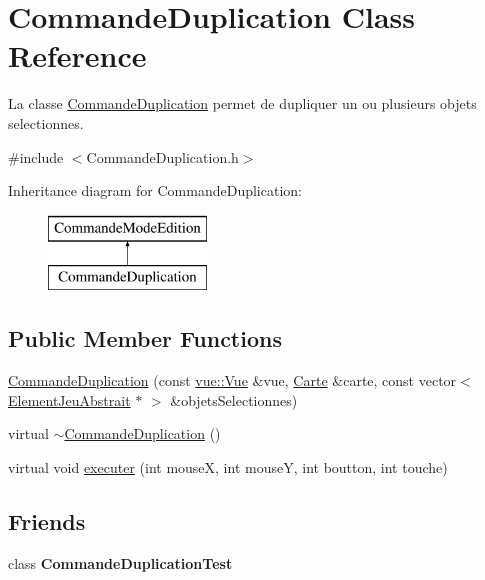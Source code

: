 \hypertarget{class_commande_duplication}{\section{Commande\-Duplication Class Reference}
\label{class_commande_duplication}
}


La classe \hyperlink{class_commande_duplication}{Commande\-Duplication} permet de dupliquer un ou plusieurs objets selectionnes.  




{\ttfamily \#include $<$Commande\-Duplication.\-h$>$}

Inheritance diagram for Commande\-Duplication\-:\begin{figure}[H]
\begin{center}
\leavevmode
\includegraphics[height=2.000000cm]{class_commande_duplication}
\end{center}
\end{figure}
\subsection*{Public Member Functions}
\begin{DoxyCompactItemize}
\item 
\hyperlink{class_commande_duplication_a789f1ac4650fb772699150a8de40ce91}{Commande\-Duplication} (const \hyperlink{classvue_1_1_vue}{vue\-::\-Vue} \&vue, \hyperlink{class_carte}{Carte} \&carte, const vector$<$ \hyperlink{class_element_jeu_abstrait}{Element\-Jeu\-Abstrait} $\ast$ $>$ \&objets\-Selectionnes)
\item 
virtual \hyperlink{class_commande_duplication_a9690bc3984ecfe34cb8a5d8f15c1fcf4}{$\sim$\-Commande\-Duplication} ()
\item 
virtual void \hyperlink{class_commande_duplication_ab8f7e0df61599b747d80c06548b630a9}{executer} (int mouse\-X, int mouse\-Y, int boutton, int touche)
\end{DoxyCompactItemize}
\subsection*{Friends}
\begin{DoxyCompactItemize}
\item 
\hypertarget{class_commande_duplication_a56556d420bb3ba15607139fbe14fb3ee}{class {\bfseries Commande\-Duplication\-Test}}\label{class_commande_duplication_a56556d420bb3ba15607139fbe14fb3ee}

\end{DoxyCompactItemize}

